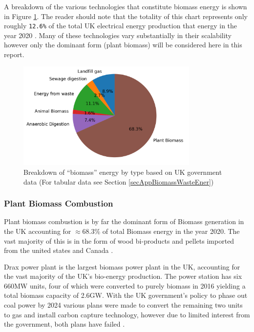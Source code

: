 \documentclass[11pt]{article}
\numberwithin{equation}{section}
\begin{document}
A breakdown of the various technologies that constitute biomass energy is shown in Figure \ref{figPie2020BiomassBreakdown}. The reader should note that the totality of this chart represents only roughly \texttt{12.6\%} of the total UK electrical energy production that energy in the year 2020 \cite{BiomassPolicyStatement}. Many of these technologies vary substantially in their scalability however only the dominant form (plant biomass) will be considered here in this report.

\begin{figure}[H]
\centering
\includegraphics[width=0.8\textwidth]{./.ob-jupyter/7fa8fd63b7c93210e8cc642d47606e1527c98a39.png}
\caption{\label{figPie2020BiomassBreakdown}Breakdown of ``biomass'' energy by type based on UK government data \cite{RenewableElecricityCap} (For tabular data see Section \ref{secAppBiomassWasteEner})}
\end{figure}

\subsubsection{Plant Biomass Combustion}
\label{sec:orga208cca}
Plant biomass combustion is by far the dominant form of Biomass generation in the UK accounting for \(\approx\)68.3\% of total Biomass energy in the year 2020. The vast majority of this is in the form of wood bi-products and pellets imported from the united states and Canada \cite{BiomassPolicyStatement}.

Drax power plant is the largest biomass power plant in the UK, accounting for the vast majority of the UK's bio-energy production. The power station has six 660MW units, four of which were converted to purely biomass in 2016 yielding a total biomass capacity of 2.6GW. With the UK government's policy to phase out coal power by 2024 various plans were made to convert the remaining two units to gas and install carbon capture technology, however due to limited interest from the government, both plans have failed \cite{EndtoCoal2024}.
\end{document}
